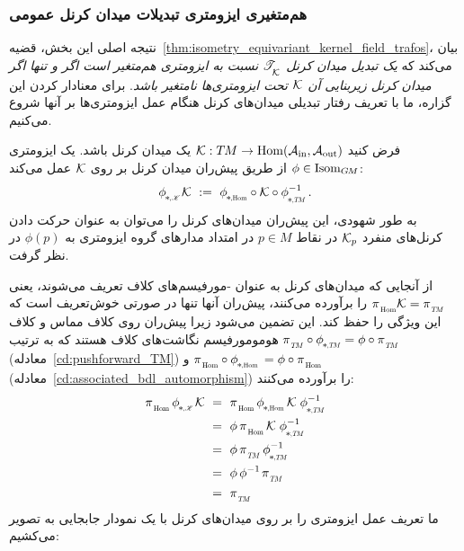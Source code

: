 \subsubsection{هم‌متغیری ایزومتری تبدیلات میدان کرنل عمومی}
\label{sec:isometry_constraint}

نتیجه اصلی این بخش، قضیه~\ref{thm:isometry_equivariant_kernel_field_trafos}، بیان می‌کند که \emph{یک تبدیل میدان کرنل $\mathscr{T}_{\overset{}{\mkern-0mu \mathcal{K}}}$ نسبت به ایزومتری هم‌متغیر است اگر و تنها اگر میدان کرنل زیربنایی آن $\mathcal{K}$ تحت ایزومتری‌ها نامتغیر باشد}.
برای معنادار کردن این گزاره، ما با تعریف رفتار تبدیلی میدان‌های کرنل هنگام عمل ایزومتری‌ها بر آنها شروع می‌کنیم.
\begin{dfn}
\label{dfn:isometry_action_kernel_fields}
    فرض کنید $\mathcal{K}: T\mkern-1.5muM \to \operatorname{Hom}(\mathcal{A}_\textup{in},\mathcal{A}_\textup{out})$ یک میدان کرنل باشد.
    یک ایزومتری $\phi \in \operatorname{Isom}_{G\mkern-1.4muM}$ از طریق پیش‌ران میدان کرنل بر روی $\mathcal{K}$ عمل می‌کند:
    \begin{align}\label{eq:kernel_constraint_isom_full_1_persian}
        \dphiK \K\ :=\ \dphiHom \!\circ \K \circ \dphiTMinv \,.
    \end{align}
    به طور شهودی، این پیش‌ران میدان‌های کرنل را می‌توان به عنوان حرکت دادن کرنل‌های منفرد $\mathcal{K}_p$ در نقاط $p\in M$ در امتداد مدارهای گروه ایزومتری به $\phi(p)$ در نظر گرفت.
\end{dfn}
از آنجایی که میدان‌های کرنل به عنوان -مورفیسم‌های کلاف تعریف می‌شوند، یعنی $\piHom \K = \piTM$ را برآورده می‌کنند، پیش‌ران آنها تنها در صورتی خوش‌تعریف است که این ویژگی را حفظ کند.
این تضمین می‌شود زیرا پیش‌ران روی کلاف مماس و کلاف هومومورفیسم نگاشت‌های کلاف هستند که به ترتیب $\piTM \circ \dphiTM = \phi \circ \piTM$ (معادله~\eqref{cd:pushforward_TM}) و ${\piHom \circ \dphiHom = \phi \circ \piHom}$ (معادله~\eqref{cd:associated_bdl_automorphism}) را برآورده می‌کنند:
\begin{align}
    \piHom\, \dphiK \K
    \ &=\ \piHom\, \dphiHom \K\; \dphiTMinv \notag \\
    \ &=\ \phi\, \piHom\, \K\; \dphiTMinv \notag \\
    \ &=\ \phi\, \piTM\, \dphiTMinv \notag \\
    \ &=\ \phi\, \phiinv\, \piTM \notag \\
    \ &=\ \piTM
\end{align}
ما تعریف عمل ایزومتری را بر روی میدان‌های کرنل با یک نمودار جابجایی به تصویر می‌کشیم:
